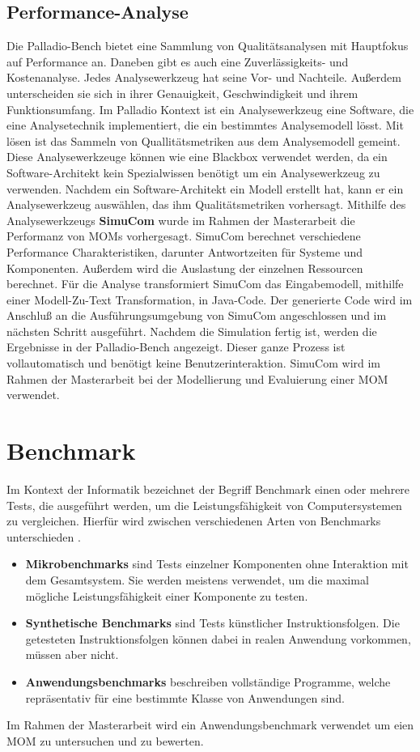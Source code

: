 \subsection{Performance-Analyse}
Die Palladio-Bench bietet eine Sammlung von Qualitätsanalysen mit Hauptfokus auf Performance an. Daneben gibt es auch eine Zuverlässigkeits- und Kostenanalyse. Jedes Analysewerkzeug hat seine Vor- und Nachteile. Außerdem unterscheiden sie sich in ihrer Genauigkeit, Geschwindigkeit und ihrem Funktionsumfang. Im Palladio Kontext ist ein Analysewerkzeug eine Software, die eine Analysetechnik implementiert, die ein bestimmtes Analysemodell lösst. Mit lösen ist das Sammeln von Quallitätsmetriken aus dem Analysemodell gemeint. Diese Analysewerkzeuge können wie eine Blackbox verwendet werden, da ein Software-Architekt kein Spezialwissen benötigt um ein Analysewerkzeug zu verwenden. Nachdem ein Software-Architekt ein Modell erstellt hat, kann er ein Analysewerkzeug auswählen, das ihm Qualitätsmetriken vorhersagt. Mithilfe des Analysewerkzeugs \textbf{SimuCom} wurde im Rahmen der Masterarbeit die Performanz von MOMs vorhergesagt. SimuCom berechnet verschiedene Performance Charakteristiken, darunter Antwortzeiten für Systeme und Komponenten. Außerdem wird die Auslastung der einzelnen Ressourcen berechnet. Für die Analyse transformiert SimuCom das Eingabemodell, mithilfe einer Modell-Zu-Text Transformation, in Java-Code. Der generierte Code wird im Anschluß an die Ausführungsumgebung von SimuCom angeschlossen und im nächsten Schritt ausgeführt. Nachdem die Simulation fertig ist, werden die Ergebnisse in der Palladio-Bench angezeigt. Dieser ganze Prozess ist vollautomatisch und benötigt keine Benutzerinteraktion. SimuCom wird im Rahmen der Masterarbeit bei der Modellierung und Evaluierung einer MOM verwendet.

\section{Benchmark}
Im Kontext der Informatik bezeichnet der Begriff Benchmark einen oder mehrere Tests, die ausgeführt werden, um die Leistungsfähigkeit von Computersystemen zu vergleichen. Hierfür wird zwischen verschiedenen Arten von Benchmarks unterschieden \cite{Lilja2004}. 
\begin{itemize}
\item \textbf{Mikrobenchmarks} sind Tests einzelner Komponenten ohne Interaktion mit dem Gesamtsystem. Sie werden meistens verwendet, um die maximal mögliche Leistungsfähigkeit einer Komponente zu testen.
\item \textbf{Synthetische Benchmarks} sind Tests künstlicher Instruktionsfolgen. Die getesteten Instruktionsfolgen können dabei in realen Anwendung vorkommen, müssen aber nicht.
\item \textbf{Anwendungsbenchmarks} beschreiben vollständige Programme, welche repräsentativ für eine bestimmte Klasse von Anwendungen sind. 
\end{itemize}
Im Rahmen der Masterarbeit wird ein Anwendungsbenchmark verwendet um eien MOM zu untersuchen und zu bewerten.




